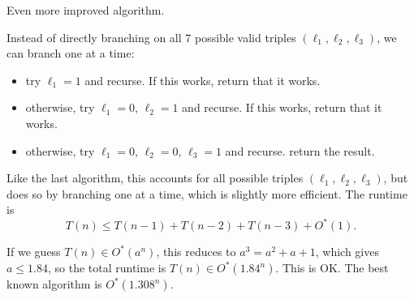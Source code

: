 \begin{example}
\exlabel

Even more improved algorithm.
\end{example}

Instead of directly branching on all $7$ possible valid triples $(\ell_1, \ell_2, \ell_3)$, we can branch one at a time: 
\begin{itemize}
    \item try $\ell_1=1$ and recurse. If this works, return that it works.
    \item otherwise, try $\ell_1=0$, $\ell_2=1$ and recurse. If this works, return that it works.
    \item otherwise, try $\ell_1=0$, $\ell_2=0$, $\ell_3=1$ and recurse. return the result.
\end{itemize}
Like the last algorithm, this accounts for all possible triples $(\ell_1, \ell_2, \ell_3)$, but does so by branching one at a time, which is slightly more efficient. The runtime is 
\[T(n)\leq T(n-1)+T(n-2)+T(n-3)+O^*(1).\]

If we guess $T(n)\in O^*(a^n)$, this reduces to $a^3=a^2+a+1$, which gives $a\leq 1.84$, so the total runtime is $T(n)\in O^*(1.84^n)$. This is OK. The best known algorithm is $O^*(1.308^n)$. 